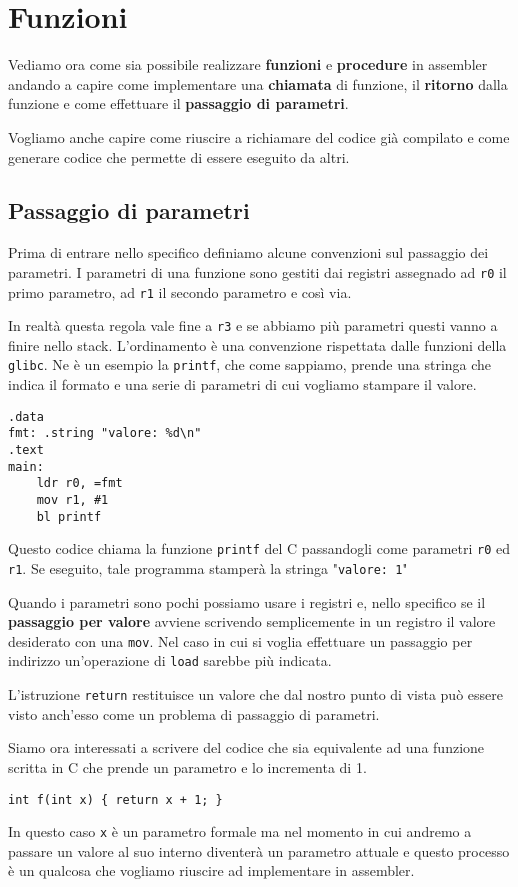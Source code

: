 \section{Funzioni}
Vediamo ora come sia possibile realizzare \textbf{funzioni} e \textbf{procedure} in assembler
andando a capire come implementare una \textbf{chiamata} di funzione, il \textbf{ritorno} dalla
funzione e come effettuare il \textbf{passaggio di parametri}.

Vogliamo anche capire come riuscire a richiamare del codice già compilato e come generare codice
che permette di essere eseguito da altri.

\subsection{Passaggio di parametri}
Prima di entrare nello specifico definiamo alcune convenzioni sul passaggio dei parametri. I
parametri di una funzione sono gestiti dai registri assegnado ad \verb|r0| il primo parametro,
ad \verb|r1| il secondo parametro e così via.

In realtà questa regola vale fine a \verb|r3| e se abbiamo più parametri questi vanno a finire
nello stack. L'ordinamento è una convenzione rispettata dalle funzioni della \verb|glibc|. Ne è un
esempio la \verb|printf|, che come sappiamo, prende una stringa che indica il formato e una serie
di parametri di cui vogliamo stampare il valore.
\begin{verbatim}
.data
fmt: .string "valore: %d\n"
.text
main:
	ldr r0, =fmt
	mov r1, #1
	bl printf
\end{verbatim}
Questo codice chiama la funzione \verb|printf| del C passandogli come parametri \verb|r0| ed
\verb|r1|. Se eseguito, tale programma stamperà la stringa "\verb|valore: 1|"

Quando i parametri sono pochi possiamo usare i registri e, nello specifico se il
\textbf{passaggio per valore} avviene scrivendo semplicemente in un registro il valore desiderato
con una \verb|mov|. Nel caso in cui si voglia effettuare un passaggio per indirizzo un'operazione
di \verb|load| sarebbe più indicata.

L'istruzione \verb|return| restituisce un valore che dal nostro punto di vista può essere visto
anch'esso come un problema di passaggio di parametri.

Siamo ora interessati a scrivere del codice che sia equivalente ad una funzione scritta in C che
prende un parametro e lo incrementa di 1.
\begin{verbatim}
int f(int x) { return x + 1; }
\end{verbatim}
In questo caso \verb|x| è un parametro formale ma nel momento in cui andremo a passare un valore
al suo interno diventerà un parametro attuale e questo processo è un qualcosa che vogliamo riuscire
ad implementare in assembler.
